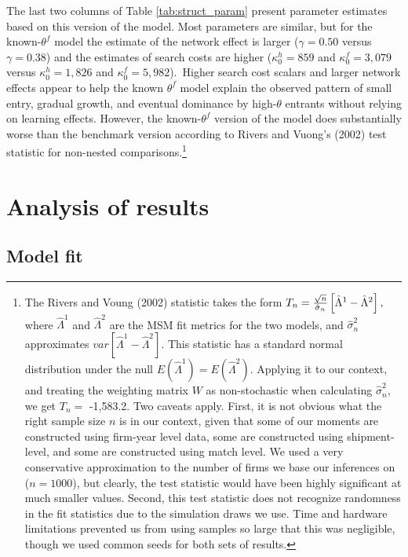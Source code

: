 \documentclass[12pt]{article}
\begin{document}
The last two columns of Table \ref{tab:struct_param} present parameter
estimates based on this version of the model. Most parameters are similar,
but for the known-$\theta ^{f}$ model the estimate of the network effect is
larger ($\gamma =0.50$ versus $\gamma =0.38$) and the estimates of search
costs are higher ($\kappa _{0}^{h}=859$ and $\kappa _{0}^{f}=3,079$ versus $%
\kappa _{0}^{h}=1,826$ and $\kappa _{0}^{f}=5,982$).\ Higher search cost
scalars and larger network effects appear to help the known $\theta ^{f}$
model explain the observed pattern of small entry, gradual growth, and
eventual dominance by high-$\theta $ entrants without relying on learning
effects. However, the known-$\theta ^{f}$ version of the model does
substantially worse than the benchmark version according to Rivers and
Vuong's (2002) test statistic for non-nested comparisons.\footnote{%
The Rivers and Voung (2002) statistic takes the form $T_{n}=\frac{\sqrt{n}}{%
\hat{\sigma}_{n}}\left[ \hat{\Lambda}^{1}-\hat{\Lambda}^{2}\right] ,$ where $%
\hat{\Lambda}^{1}$ and $\hat{\Lambda}^{2}$ are the MSM fit metrics for the
two models, and $\hat{\sigma}_{n}^{2}$ approximates $var\left[ \hat{\Lambda}%
^{1}-\hat{\Lambda}^{2}\right] .$ This statistic has a standard normal
distribution under the null $E(\hat{\Lambda}^{1})=E(\hat{\Lambda}^{2}).$
Applying it to our context, and treating the weighting matrix $W$ as
non-stochastic when calculating $\hat{\sigma}_{n}^{2}$, we get $T_{n}=$
-1,583.2. Two caveats apply. First, it is not obvious what the right sample
size $n$ is in our context, given that some of our moments are constructed
using firm-year level data, some are constructed using shipment-level, and
some are constructed using match level. We used a very conservative
approximation to the number of firms we base our inferences on ($n=1000$),
but clearly, the test statistic would have been highly significant at much
smaller values. Second, this test statistic does not recognize randomness in
the fit statistics due to the simulation draws we use. Time and hardware
limitations prevented us from using samples so large that this was
negligible, though we used common seeds for both sets of results.}

\section{Analysis of results}

\subsection{Model fit}
\end{document}
